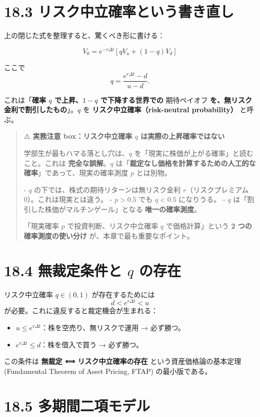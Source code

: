 \documentclass[11pt,a4paper]{report}
\begin{document}
\section{18.3 リスク中立確率という書き直し}

上の閉じた式を整理すると、驚くべき形に書ける：

\[ \boxed{\;V_0 = e^{-r\Delta t} [q V_u + (1 - q) V_d]\;} \]

ここで \[ q = \frac{e^{r \Delta t} - d}{u - d}. \]

これは「\textbf{確率 $q$ で上昇、$1-q$ で下降する世界での }期待ペイオフ\textbf{ を、無リスク金利で割引したもの}」。$q$ を \textbf{リスク中立確率（risk-neutral probability）} と呼ぶ。

\begin{quote}
⚠️ \textbf{実務注意 box：リスク中立確率 $q$ は実際の上昇確率ではない}

学部生が最もハマる落とし穴は、$q$ を「現実に株価が上がる確率」と読むこと。これは \textbf{完全な誤解}。$q$ は「\textbf{裁定なし価格を計算するための人工的な確率}」であって、現実の確率測度 $p$ とは別物。

- $q$ の下では、株式の期待リターンは無リスク金利 $r$（リスクプレミアム 0）。これは現実とは違う。
- $p > 0.5$ でも $q < 0.5$ になりうる。
- $q$ は「割引した株価がマルチンゲール」となる \textbf{唯一の確率測度}。

「現実確率 $p$ で投資判断、リスク中立確率 $q$ で価格計算」という \textbf{2 つの確率測度の使い分け} が、本章で最も重要なポイント。
\end{quote}

\section{18.4 無裁定条件と $q$ の存在}

リスク中立確率 $q \in (0, 1)$ が存在するためには \[ d < e^{r \Delta t} < u \] が必要。これに違反すると裁定機会が生まれる：

\begin{itemize}
\item $u \le e^{r \Delta t}$：株を空売り、無リスクで運用 → 必ず勝つ。
\item $e^{r \Delta t} \le d$：株を借入で買う → 必ず勝つ。
\end{itemize}

この条件は \textbf{無裁定 ⟺ リスク中立確率の存在} という資産価格論の基本定理 (Fundamental Theorem of Asset Pricing, FTAP) の最小版である。

\section{18.5 多期間二項モデル}
\end{document}
